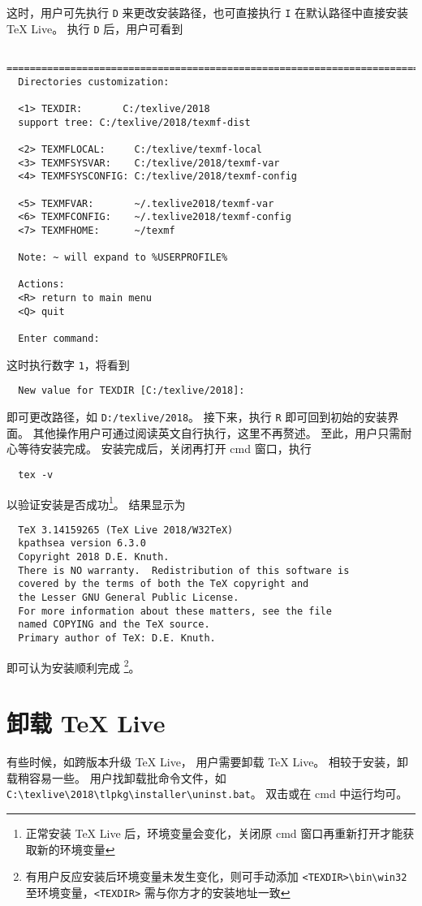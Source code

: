 \documentclass{ctexart}
\begin{document}
这时，用户可先执行 \texttt{D} 来更改安装路径，也可直接执行 \texttt{I} 在默认路径中直接安装 \TeX{} Live。
执行 \texttt{D} 后，用户可看到
\begin{lstlisting}
  ==============================================================================
  Directories customization:
  
  <1> TEXDIR:       C:/texlive/2018
  support tree: C:/texlive/2018/texmf-dist
  
  <2> TEXMFLOCAL:     C:/texlive/texmf-local
  <3> TEXMFSYSVAR:    C:/texlive/2018/texmf-var
  <4> TEXMFSYSCONFIG: C:/texlive/2018/texmf-config
  
  <5> TEXMFVAR:       ~/.texlive2018/texmf-var
  <6> TEXMFCONFIG:    ~/.texlive2018/texmf-config
  <7> TEXMFHOME:      ~/texmf
  
  Note: ~ will expand to %USERPROFILE%
  
  Actions:
  <R> return to main menu
  <Q> quit
  
  Enter command:
\end{lstlisting}
这时执行数字 \texttt{1}，将看到
\begin{lstlisting}
  New value for TEXDIR [C:/texlive/2018]:
\end{lstlisting}
即可更改路径，如 \texttt{D:/texlive/2018}。
接下来，执行 \texttt{R} 即可回到初始的安装界面。
其他操作用户可通过阅读英文自行执行，这里不再赘述。
至此，用户只需耐心等待安装完成。
安装完成后，关闭再打开 \textsf{cmd} 窗口，执行
\begin{lstlisting}
  tex -v
\end{lstlisting}
以验证安装是否成功\footnote{正常安装 \TeX{} Live 后，环境变量会变化，关闭原 \textsf{cmd} 窗口再重新打开才能获取新的环境变量}。
结果显示为
\begin{lstlisting}
  TeX 3.14159265 (TeX Live 2018/W32TeX)
  kpathsea version 6.3.0
  Copyright 2018 D.E. Knuth.
  There is NO warranty.  Redistribution of this software is
  covered by the terms of both the TeX copyright and
  the Lesser GNU General Public License.
  For more information about these matters, see the file
  named COPYING and the TeX source.
  Primary author of TeX: D.E. Knuth.
\end{lstlisting}
即可认为安装顺利完成 \footnote{有用户反应安装后环境变量未发生变化，则可手动添加 \texttt{<TEXDIR>\textbackslash bin\textbackslash win32} 至环境变量，\texttt{<TEXDIR>} 需与你方才的安装地址一致}。

\section{卸载 \TeX{} Live}
有些时候，如跨版本升级 \TeX{} Live， 用户需要卸载 \TeX{} Live。
相较于安装，卸载稍容易一些。
用户找卸载批命令文件，如 \texttt{C:\textbackslash texlive\textbackslash 2018\textbackslash tlpkg\textbackslash installer\textbackslash uninst.bat}。
双击或在 \textsf{cmd} 中运行均可。
\end{document}
